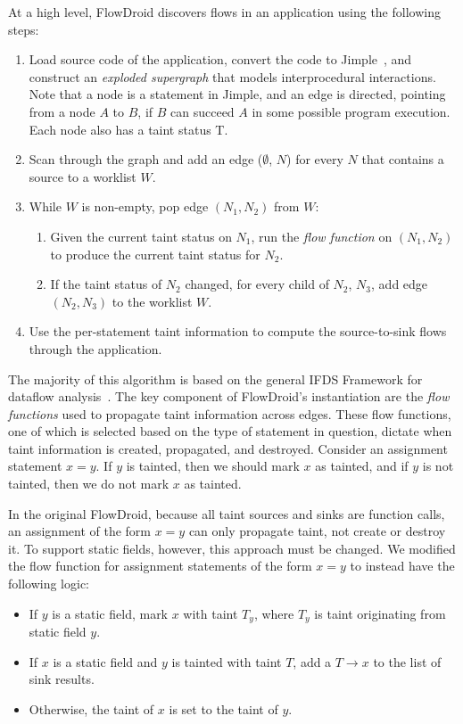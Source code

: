 At a high level, FlowDroid discovers flows in an application using the following steps:
\begin{enumerate}
\item Load source code of the application, convert the code to Jimple~\cite{soot}, and construct an \emph{exploded supergraph} that models interprocedural interactions. Note that a node is a statement in Jimple, and an edge is directed, pointing from a node $A$ to $B$, if $B$ can succeed $A$ in some possible program execution. Each node also has a taint status T.
\item Scan through the graph and add an edge ($\emptyset$, $N$) for every $N$ that contains a source to a worklist $W$.
\item While $W$ is non-empty, pop edge $(N_1, N_2)$ from $W$:
\begin{enumerate}
\item Given the current taint status on $N_1$, run the \emph{flow function} on $(N_1, N_2)$ to produce the current taint status for $N_2$.
\item If the taint status of $N_2$ changed, for every child of $N_2$, $N_3$, add edge $(N_2, N_3)$ to the worklist $W$.
\end{enumerate}
\item Use the per-statement taint information to compute the source-to-sink flows through the application.
\end{enumerate}

The majority of this algorithm is based on the general IFDS Framework for dataflow analysis~\cite{ifds}. The key component of FlowDroid's instantiation are the \emph{flow functions} used to propagate taint information across edges. These flow functions, one of which is selected based on the type of statement in question, dictate when taint information is created, propagated, and destroyed. Consider an assignment statement $x = y$. If $y$ is tainted, then we should mark $x$ as tainted, and if $y$ is not tainted, then we do not mark $x$ as tainted. 

In the original FlowDroid, because all taint sources and sinks are function calls, an assignment of the form $x = y$ can only propagate taint, not create or destroy it. To support static fields, however, this approach must be changed. We modified the flow function for assignment statements of the form $x = y$ to instead have the following logic:

\begin{itemize}
\item If $y$ is a static field, mark $x$ with taint $T_y$, where $T_y$ is taint originating from static field $y$.
\item If $x$ is a static field and $y$ is tainted with taint $T$, add a $T\rightarrow x$ to the list of sink results.
\item Otherwise, the taint of $x$ is set to the taint of $y$.
\end{itemize}

